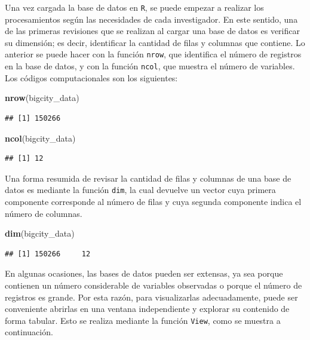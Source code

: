 \documentclass[
  spanish,
  12pt,
]{book}
\newenvironment{Shaded}{\begin{snugshade}}{\end{snugshade}}
\newcommand{\FunctionTok}[1]{\textcolor[rgb]{0.13,0.29,0.53}{\textbf{#1}}}
\newcommand{\NormalTok}[1]{#1}
\begin{document}
Una vez cargada la base de datos en \texttt{R}, se puede empezar a realizar los procesamientos según las necesidades de cada investigador. En este sentido, una de las primeras revisiones que se realizan al cargar una base de datos es verificar su dimensión; es decir, identificar la cantidad de filas y columnas que contiene. Lo anterior se puede hacer con la función \texttt{nrow}, que identifica el número de registros en la base de datos, y con la función \texttt{ncol}, que muestra el número de variables. Los códigos computacionales son los siguientes:

\begin{Shaded}
\begin{Highlighting}[]
\FunctionTok{nrow}\NormalTok{(bigcity\_data)}
\end{Highlighting}
\end{Shaded}

\begin{verbatim}
## [1] 150266
\end{verbatim}

\begin{Shaded}
\begin{Highlighting}[]
\FunctionTok{ncol}\NormalTok{(bigcity\_data)}
\end{Highlighting}
\end{Shaded}

\begin{verbatim}
## [1] 12
\end{verbatim}

Una forma resumida de revisar la cantidad de filas y columnas de una base de datos es mediante la función \texttt{dim}, la cual devuelve un vector cuya primera componente corresponde al número de filas y cuya segunda componente indica el número de columnas.

\begin{Shaded}
\begin{Highlighting}[]
\FunctionTok{dim}\NormalTok{(bigcity\_data)}
\end{Highlighting}
\end{Shaded}

\begin{verbatim}
## [1] 150266     12
\end{verbatim}

En algunas ocasiones, las bases de datos pueden ser extensas, ya sea porque contienen un número considerable de variables observadas o porque el número de registros es grande. Por esta razón, para visualizarlas adecuadamente, puede ser conveniente abrirlas en una ventana independiente y explorar su contenido de forma tabular. Esto se realiza mediante la función \texttt{View}, como se muestra a continuación.
\end{document}
